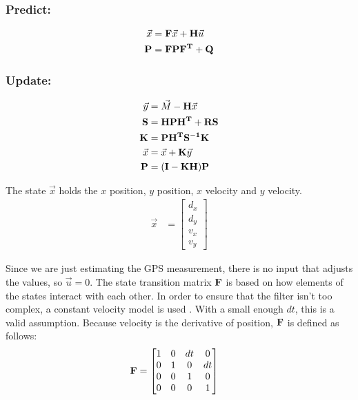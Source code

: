 \subsubsection*{Predict:}
\begin{align}
    \vec{x} &= \mathbf{F}\vec{x} + \mathbf{H}\vec{u} \label{eq:state_predict}\\ 
    \mathbf{P} &= \mathbf{F}\mathbf{P}\mathbf{F^T} + \mathbf{Q} \label{eq:var_predict}
\end{align}
\subsubsection*{Update:}
\begin{align}
    \vec{y} &= \vec{M} - \mathbf{H}\vec{x} \label{eq:innovation_up}\\
    \mathbf{S}&= \mathbf{HPH^T+RS} \label{eq:inter_up}\\
    \mathbf{K} &= \mathbf{PH^TS^{-1}K} \label{eq:kalgain_up}\\
    \vec{x} &= \vec{x} + \mathbf{K}\vec{y} \label{eq:state_up}\\
    \mathbf{P} &= \mathbf{(I-KH)P} \label{eq:var_up}
\end{align} \par
The state $\vec{x}$ holds the $x$ position, $y$ position, $x$ velocity and $y$ velocity. \\
\begin{align}
	\vec{x} &= \begin{bmatrix}
				d_x \\
				d_y\\
				v_x\\
				v_y
				\end{bmatrix}
\end{align}\par
Since we are just estimating the GPS measurement, there is no input that adjusts the values, so $\vec{u} = 0$. The state transition matrix $\mathbf{F}$ is based on how elements of the states interact with each other. In order to ensure that the filter isn't too complex, a constant velocity model is used \cite{kf_book}. With a small enough $dt$, this is a valid assumption. Because velocity is the derivative of position, $\mathbf{F}$ is defined as follows: 
\begin{align}
	\mathbf{F} &= \begin{bmatrix}
					1 & 0 & dt & 0 \\
					0 & 1 & 0 & dt \\
					0 & 0 & 1 & 0 \\
					0 & 0 & 0 & 1
				\end{bmatrix}
\end{align} \par
